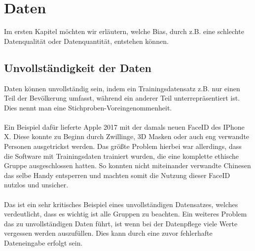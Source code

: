 \documentclass[12pt,oneside,a4paper,parskip]{scrbook}
\begin{document}
\section{Daten}
\label{section:data}
Im ersten Kapitel möchten wir erläutern, welche Bias, durch z.B. eine schlechte Datenqualität oder Datenquantität, entstehen können.

\subsection{Unvollständigkeit der Daten}
\label{section:uncompleteData}
Daten können unvollständig sein, indem ein Trainingsdatensatz z.B. nur einen Teil der Bevölkerung umfasst, während ein anderer Teil unterrepräsentiert ist. Dies nennt man eine Stichproben-Voreingenommenheit.
\\\\
Ein Beispiel dafür lieferte Apple 2017 mit der damals neuen FaceID des IPhone X.
Diese konnte zu Beginn durch Zwillinge, 3D Masken oder auch eng verwandte Personen ausgetrickst werden. Das größte Problem hierbei war allerdings, dass die Software mit Trainingsdaten trainiert wurden, die eine komplette ethische Gruppe ausgeschlossen hatten. So konnten nicht miteinander verwandte Chinesen das selbe Handy entsperren und machten somit die Nutzung dieser FaceID nutzlos und unsicher\cite{iphone}.
\\\\
Das ist ein sehr kritisches Beispiel eines unvollständigen Datensatzes, welches verdeutlicht, dass es wichtig ist alle Gruppen zu beachten. Ein weiteres Problem das zu unvollständigen Daten führt, ist wenn bei der Datenpflege viele Werte vergessen werden auszufüllen. Dies kann durch eine zuvor fehlerhafte Dateneingabe erfolgt sein.
\end{document}
